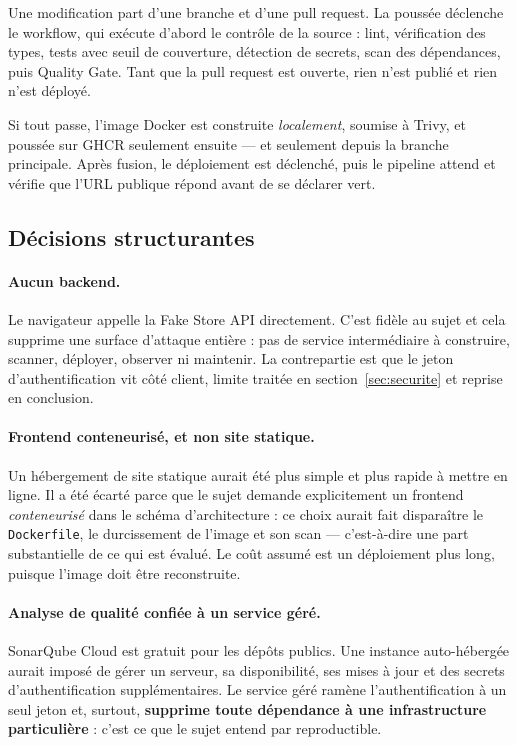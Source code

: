 \documentclass[11pt,a4paper]{article}
\begin{document}
Une modification part d'une branche et d'une pull request. La poussée
déclenche le workflow, qui exécute d'abord le contrôle de la source : lint,
vérification des types, tests avec seuil de couverture, détection de
secrets, scan des dépendances, puis Quality Gate. Tant que la pull request
est ouverte, rien n'est publié et rien n'est déployé.

Si tout passe, l'image Docker est construite \emph{localement}, soumise à
Trivy, et poussée sur GHCR seulement ensuite — et seulement depuis la
branche principale. Après fusion, le déploiement est déclenché, puis le
pipeline attend et vérifie que l'URL publique répond avant de se déclarer
vert.

\subsection{Décisions structurantes}

\paragraph{Aucun backend.} Le navigateur appelle la Fake Store API
directement. C'est fidèle au sujet et cela supprime une surface d'attaque
entière : pas de service intermédiaire à construire, scanner, déployer,
observer ni maintenir. La contrepartie est que le jeton
d'authentification vit côté client, limite traitée en
section~\ref{sec:securite} et reprise en conclusion.

\paragraph{Frontend conteneurisé, et non site statique.} Un hébergement de
site statique aurait été plus simple et plus rapide à mettre en ligne. Il a
été écarté parce que le sujet demande explicitement un frontend
\emph{conteneurisé} dans le schéma d'architecture : ce choix aurait fait
disparaître le \texttt{Dockerfile}, le durcissement de l'image et son scan —
c'est-à-dire une part substantielle de ce qui est évalué. Le coût assumé est
un déploiement plus long, puisque l'image doit être reconstruite.

\paragraph{Analyse de qualité confiée à un service géré.} SonarQube Cloud
est gratuit pour les dépôts publics. Une instance auto-hébergée aurait
imposé de gérer un serveur, sa disponibilité, ses mises à jour et des
secrets d'authentification supplémentaires. Le service géré ramène
l'authentification à un seul jeton et, surtout, \textbf{supprime toute
dépendance à une infrastructure particulière} : c'est ce que le sujet entend
par reproductible.
\end{document}
